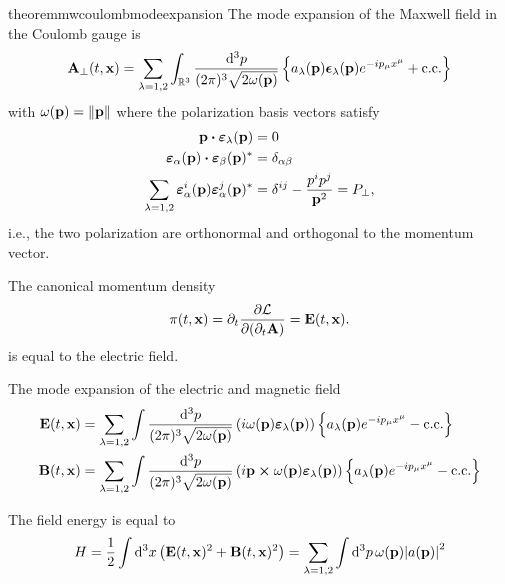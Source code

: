 \begin{restatable}{theorem}{mwcoulombmodeexpansion}\label{thm:mw_coulomb_mode_expansion}
	The mode expansion of the Maxwell field in the Coulomb gauge is
	\begin{equation}
		\vb{A}_\perp(t,\vb{x})
		=
		\sum_{\lambda=1,2}
		\int_{\mathbb{R}^3}\frac{\dd[3]{p}}{(2\pi)^3\sqrt{2\omega(\vb{p})}}
		\left\{
			a_\lambda(\vb{p})
			\boldsymbol{\epsilon}_\lambda(\vb{p})
			e^{-ip_\mu x^\mu}
			+
			\text{c.c.}
		\right\}
		\label{eq:mw_coulomb_mode_expansion}
	\end{equation}
	with $\omega(\vb{p})=\norm{\vb{p}}$ where the polarization basis vectors satisfy~\cite[p.~341]{Srednicki2007}
	\begin{align}
		\vb{p}
		\vdot
		\boldsymbol{\varepsilon}_\lambda(\vb{p})
		&=
		0
		\\
		\boldsymbol{\varepsilon}_\alpha(\vb{p})
		\vdot
		\boldsymbol{\varepsilon}_\beta(\vb{p})^*
		&=
		\delta_{\alpha\beta}
		\\
		\sum_{\lambda=1,2}
		\boldsymbol{\varepsilon}_\alpha^i(\vb{p})
		\boldsymbol{\varepsilon}_\alpha^j(\vb{p})^*
		&=
		\delta^{ij}
		-
		\frac{p^ip^j}{\vb{p}^2}
		=
		P_\perp
		\label{eq:mw_coulomb_polarization_basis}
		,
	\end{align}
	i.e., the two polarization are orthonormal and orthogonal to the momentum vector.
\end{restatable}
\begin{corollary}
	The canonical momentum density
	\begin{equation}
		\pi(t,\vb{x})
		=
		\partial_t\pdv{\mathcal{L}}{(\partial_t\vb{A})}
		=
		\vb{E}(t,\vb{x})
		\label{eq:mw_coulomb_mom}.
	\end{equation}
	is equal to the electric field.
\end{corollary}
\begin{theorem}
	The mode expansion of the electric and magnetic field
	\begin{align}
		\vb{E}(t,\vb{x})
		&=
		\sum_{\lambda=1,2}
		\int\frac{\dd[3]{p}}{(2\pi)^3\sqrt{2\omega(\vb{p})}}
		\left(
			i\omega(\vb{p})
			\boldsymbol{\varepsilon}_\lambda(\vb{p})
		\right)
		\left\{
			a_\lambda(\vb{p})
			e^{-ip_\mu x^\mu}
			-
			\text{c.c.}
		\right\}
		\\
		\vb{B}(t,\vb{x})
		&=
		\sum_{\lambda=1,2}
		\int\frac{\dd[3]{p}}{(2\pi)^3\sqrt{2\omega(\vb{p})}}
		\left(
			i\vb{p}\cross\omega(\vb{p})
			\boldsymbol{\varepsilon}_\lambda(\vb{p})
		\right)
		\left\{
			a_\lambda(\vb{p})
			e^{-ip_\mu x^\mu}
			-
			\text{c.c.}
		\right\}
	\end{align}
\end{theorem}
\begin{lemma}\label{thm:mw_energy}
	The field energy is equal to
	\begin{equation}
		H
		=
		\frac{1}{2}
		\int\dd[3]{x}
		\left(
			\vb{E}(t,\vb{x})^2
			+
			\vb{B}(t,\vb{x})^2
		\right)
		=
		\sum_{\lambda=1,2}
		\int\dd[3]{p}
		\omega(\vb{p})
		\abs{a(\vb{p})}^2
	\end{equation}
\end{lemma}
